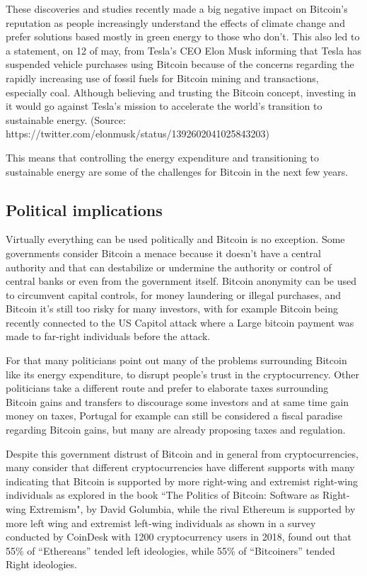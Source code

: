\documentclass{article}
\begin{document}
These discoveries and studies recently made a big negative impact on Bitcoin's reputation as people increasingly understand the effects of climate change and prefer solutions based mostly in green energy to those who don’t. This also led to a statement, on 12 of may, from Tesla's CEO Elon Musk informing that Tesla has suspended vehicle purchases using Bitcoin because of the concerns regarding the rapidly increasing use of fossil fuels for Bitcoin mining and transactions, especially coal. Although believing and trusting the Bitcoin concept, investing in it would go against Tesla’s mission to accelerate the world’s transition to sustainable energy. (Source: https://twitter.com/elonmusk/status/1392602041025843203)

This means that controlling the energy expenditure and transitioning to sustainable energy are some of the challenges for Bitcoin in the next few years.

\subsection{Political implications}

Virtually everything can be used politically and Bitcoin is no exception. Some governments consider Bitcoin a menace because it doesn't have a central authority and that can destabilize or undermine the authority or control of central banks or even from the government itself. Bitcoin anonymity can be used to circumvent capital controls, for money laundering or illegal purchases, and Bitcoin it’s still too risky for many investors, with for example Bitcoin being recently connected to the US Capitol attack where a Large bitcoin payment was made to far-right individuals before the attack.

For that many politicians point out many of the problems surrounding Bitcoin like its energy expenditure, to disrupt people's trust in the cryptocurrency. Other politicians take a different route and prefer to elaborate taxes surrounding Bitcoin gains and transfers to discourage some investors and at same time gain money on taxes, Portugal for example can still be considered a fiscal paradise regarding Bitcoin gains, but many are already proposing taxes and regulation.

Despite this government distrust of Bitcoin and in general from cryptocurrencies, many consider that different cryptocurrencies have different supports with many indicating that Bitcoin is supported by more right-wing and extremist right-wing individuals as explored in the book “The Politics of Bitcoin: Software as Right-wing Extremism", by David Golumbia, while the rival Ethereum is supported by more left wing and extremist left-wing individuals as shown in a survey conducted by CoinDesk with 1200 cryptocurrency users in 2018, found out that 55\% of “Ethereans” tended left ideologies, while 55\% of “Bitcoiners” tended Right ideologies.
\end{document}
